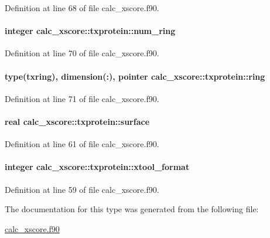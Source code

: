 Definition at line 68 of file calc\-\_\-xscore.\-f90.

\hypertarget{structcalc__xscore_1_1txprotein_a7417ab64ee2e434d3abff8a11fe345c1}{
\paragraph[{num\-\_\-ring}]{\setlength{\rightskip}{0pt plus 5cm}integer calc\-\_\-xscore\-::txprotein\-::num\-\_\-ring}}\label{structcalc__xscore_1_1txprotein_a7417ab64ee2e434d3abff8a11fe345c1}


Definition at line 70 of file calc\-\_\-xscore.\-f90.

\hypertarget{structcalc__xscore_1_1txprotein_a0a5f21d3b183496adecb2ac25d0b151b}{
\paragraph[{ring}]{\setlength{\rightskip}{0pt plus 5cm}type({\bf txring}), dimension(\-:), pointer calc\-\_\-xscore\-::txprotein\-::ring}}\label{structcalc__xscore_1_1txprotein_a0a5f21d3b183496adecb2ac25d0b151b}


Definition at line 71 of file calc\-\_\-xscore.\-f90.

\hypertarget{structcalc__xscore_1_1txprotein_a8b01b3647674beb531f864574b92561e}{
\paragraph[{surface}]{\setlength{\rightskip}{0pt plus 5cm}real calc\-\_\-xscore\-::txprotein\-::surface}}\label{structcalc__xscore_1_1txprotein_a8b01b3647674beb531f864574b92561e}


Definition at line 61 of file calc\-\_\-xscore.\-f90.

\hypertarget{structcalc__xscore_1_1txprotein_ae01af91683491be6a3ffbe960d4d2231}{
\paragraph[{xtool\-\_\-format}]{\setlength{\rightskip}{0pt plus 5cm}integer calc\-\_\-xscore\-::txprotein\-::xtool\-\_\-format}}\label{structcalc__xscore_1_1txprotein_ae01af91683491be6a3ffbe960d4d2231}


Definition at line 59 of file calc\-\_\-xscore.\-f90.



The documentation for this type was generated from the following file\-:\begin{DoxyCompactItemize}
\item 
\hyperlink{calc__xscore_8f90}{calc\-\_\-xscore.\-f90}\end{DoxyCompactItemize}
